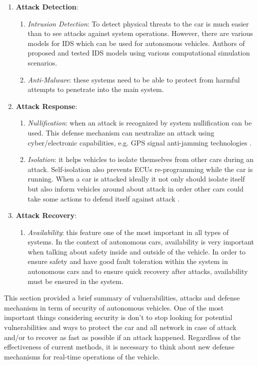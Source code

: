 \begin{enumerate}
	\item \textbf{Attack Detection}:
	\begin{enumerate}
		\item \textit{Intrusion Detection}: To detect physical threats to the car is much easier than to see attacks against system operations. However, there are various models for \gls{IDS} which can be used for autonomous vehicles. Authors of \cite{intrution} proposed and tested \gls{IDS} models using various computational simulation scenarios.  
		\item \textit{Anti-Malware}: these systems need to be able to protect from harmful attempts to penetrate into the main system. 
	\end{enumerate}
	\item \textbf{Attack Response}:
	\begin{enumerate}
		\item \textit{Nullification}: when an attack is recognized by system nullification can be used. This defense mechanism can neutralize an attack using cyber/electronic capabilities, e.g. \gls{GPS} signal anti-jamming technologies \cite{sec}. 
		\item \textit{Isolation}: it helps vehicles to isolate themselves from other cars during an attack. Self-isolation also prevents \glspl{ECU} re-programming while the car is running. When a car is attacked ideally it not only should isolate itself but also inform vehicles around about attack in order other cars could take some actions to defend itself against attack \cite{sec}.
	\end{enumerate}
	\item \textbf{Attack Recovery}:
	\begin{enumerate}
		\item \textit{Availability}: this feature one of the most important in all types of systems. In the context of autonomous cars, availability is very important when talking about safety inside and outside of the vehicle. In order to ensure safety and have good fault toleration within the system in autonomous cars and to ensure quick recovery after attacks, availability must be ensured in the system.
	\end{enumerate}
\end{enumerate}	

This section provided a brief summary of vulnerabilities, attacks and defense mechanism in term of security of autonomous vehicles. One of the most important things considering security is don't to stop looking for potential vulnerabilities and ways to protect the car and all network in case of attack and/or to recover as fast as possible if an attack happened. Regardless of the effectiveness of current methods, it is necessary to think about new defense mechanisms for real-time operations of the vehicle. 	

